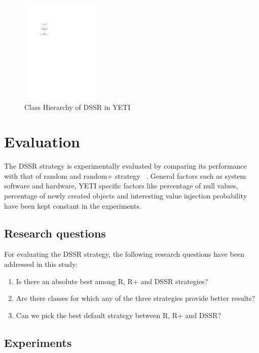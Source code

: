 \begin{figure}[h]
\centering
\includegraphics[width=4cm,height=5cm]{DSSR/hierarchy.pdf}
\caption{Class Hierarchy of DSSR in YETI}
\label{fig:hierarchyofDSSR}
\end{figure}







\section{Evaluation}\label{sec:eval}

The DSSR strategy is experimentally evaluated by comparing its performance with that of random and random+ strategy ~\cite{Leitner2007}. General factors such as system software and hardware, YETI specific factors like percentage of null values, percentage of newly created objects and interesting value injection probability have been kept constant in the experiments.

\subsection{Research questions}
For evaluating the DSSR strategy, the following research questions have been addressed in this study:
\begin{enumerate}
\item Is there an absolute best among R, R+ and DSSR strategies?
\item Are there classes for which any of the three strategies provide better results?
\item Can we pick the best default strategy between R, R+ and DSSR?
\end{enumerate}



\subsection{Experiments}

